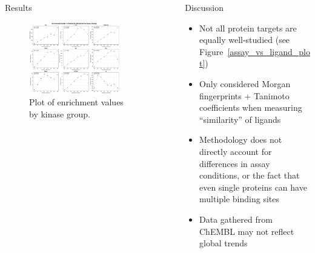 \documentclass[final]{beamer}
\newlength{\sepwidth}
\newlength{\colwidth}
\newcommand{\separatorcolumn}{\begin{column}{\sepwidth}\end{column}}
\begin{document}
\begin{frame}[t]
\begin{columns}[t]
\begin{column}{\colwidth}
\begin{block}{Results}
\begin{figure}
        \includegraphics[width=0.85\textwidth]{../figures/enrichment_factor_by_group.png}
        \caption{Plot of enrichment values by kinase group.}
        \label{enrichment_plot}
    \end{figure}

  \end{block}

\end{column}

\separatorcolumn

\begin{column}{\colwidth} 
  \begin{block}{Discussion}
    \small
    \begin{itemize}
        \item Not all protein targets are equally well-studied (see Figure~\ref{assay_vs_ligand_plot})
        \item Only considered Morgan fingerprints + Tanimoto coefficients when measuring ``similarity'' of ligands
        \item Methodology does not directly account for differences in assay conditions, or the fact that even single proteins can have multiple binding sites
        \item Data gathered from ChEMBL may not reflect global trends
    \end{itemize}


\end{block}
\end{column}
\end{columns}
\end{frame}
\end{document}
